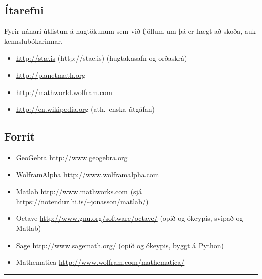 \documentclass[b5paper,11pt,icelandic]{sphinxmanual}
\begin{document}


\subsection{Ítarefni}
\label{kafli01:itarefni}
Fyrir nánari útlistun á hugtökunum sem við fjöllum um þá er hægt að skoða,
auk kennslubókarinnar,
\begin{itemize}
\item {} 
\href{http://stae.is}{http://stæ.is} (http://stae.is) (hugtakasafn og orðaskrá)

\item {} 
\url{http://planetmath.org}

\item {} 
\url{http://mathworld.wolfram.com}

\item {} 
\url{http://en.wikipedia.org} (ath. enska útgáfan)

\end{itemize}


\subsection{Forrit}
\label{kafli01:forrit}\begin{itemize}
\item {} 
GeoGebra \url{http://www.geogebra.org}

\item {} 
WolframAlpha \url{http://www.wolframalpha.com}

\item {} 
Matlab \url{http://www.mathworks.com}
(sjá \url{https://notendur.hi.is/~jonasson/matlab/})

\item {} 
Octave \url{http://www.gnu.org/software/octave/} (opið og ókeypis, svipað og Matlab)

\item {} 
Sage \url{http://www.sagemath.org/}  (opið og ókeypis, byggt á Python)

\item {} 
Mathematica \url{http://www.wolfram.com/mathematica/}

\end{itemize}


\bigskip\hrule{}\bigskip
\end{document}
